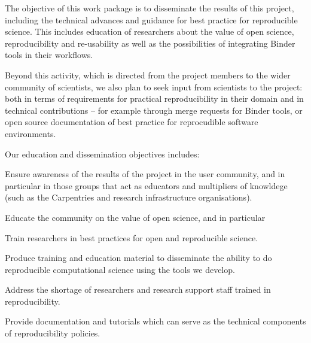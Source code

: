 \begin{workpackage}[id=education,wphases=0-36!1,swsites,
  title=Education and Dissemination,
  short=Education,
  lead=IFR,
  IFRRM=10,
  MPRM=6,
  SRLRM=7,
  QSRM=3,
  UIORM=9
]


\begin{wpobjectives}
  The objective of this work package is to disseminate the results of this
  project, including the technical advances and guidance for best practice for
  reproducible science. This includes education of researchers about the value of
  open science, reproducibility and re-usability as well as the possibilities of
  integrating Binder tools in their workflows.

  Beyond this activity, which is directed from the project members to the wider community of
  scientists, we also plan to seek input from scientists to the project: both in
  terms of requirements for practical reproducibility in their domain and in
  technical contributions -- for example through merge requests for Binder
  tools, or open source documentation of best practice for reprocudible software
  environments.

  Our education and dissemination objectives includes:
 \begin{compactitem}
   \item Ensure awareness of the results of the project in the user community,
     and in particular in those groups that act as educators and multipliers of
     knowldege (such as the Carpentries and research infrastructure organisations).
   \item Educate the community on the value of open science, and in particular
   \item Train researchers in best practices for open and reproducible science.
   \item Produce training and education material to disseminate the ability to
     do reproducible computational science using the tools we develop.
   \item Address the shortage of researchers and research support staff trained in reproducibility.
   \item Provide documentation and tutorials which can serve as the technical
     components of reproducibility policies.
 \end{compactitem}
\end{wpobjectives}



\end{workpackage}
